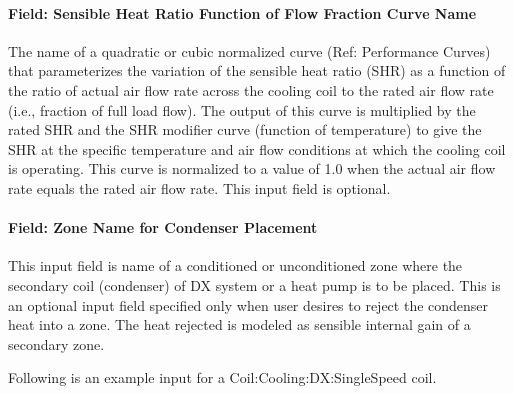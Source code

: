 \paragraph{Field: Sensible Heat Ratio Function of Flow Fraction Curve Name}\label{field-sensible-heat-ratio-function-of-flow-fraction-curve-name}

The name of a quadratic or cubic normalized curve (Ref: Performance Curves) that parameterizes the variation of the sensible heat ratio (SHR) as a function of the ratio of actual air flow rate across the cooling coil to the rated air flow rate (i.e., fraction of full load flow). The output of this curve is multiplied by the rated SHR and the SHR modifier curve (function of temperature) to give the SHR at the specific temperature and air flow conditions at which the cooling coil is operating. This curve is normalized to a value of 1.0 when the actual air flow rate equals the rated air flow rate. This input field is optional.

\paragraph{Field: Zone Name for Condenser Placement}\label{field-zone-name-for-condenser-placement}

This input field is name of a conditioned or unconditioned zone where the secondary coil (condenser) of DX system or a heat pump is to be placed. This is an optional input field specified only when user desires to reject the condenser heat into a zone. The heat rejected is modeled as sensible internal gain of a secondary zone.

Following is an example input for a Coil:Cooling:DX:SingleSpeed coil.

